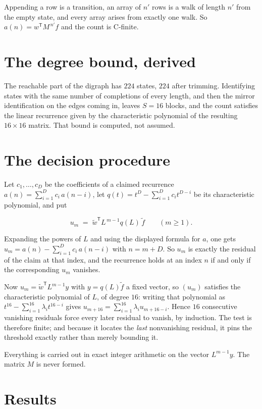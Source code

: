 \documentclass[11pt]{article}
\theoremstyle{definition}
\begin{document}
Appending a row is a transition, an array of $n'$ rows is a walk of length $n'$ from the empty state, and every array arises from exactly one walk. So $a(n) = w^{\mathsf T}M^{\,n'}f$ and the count is C-finite.

\section{The degree bound, derived}

The reachable part of the digraph has $224$ states, $224$ after trimming. Identifying states with the same number of completions of every length, and then the mirror identification on the edges coming in, leaves $S = 16$ blocks, and the count satisfies the linear recurrence given by the characteristic polynomial of the resulting $16\times16$ matrix. That bound is computed, not assumed.

\section{The decision procedure}

Let $c_1,\dots,c_D$ be the coefficients of a claimed recurrence $a(n) = \sum_{i=1}^{D} c_i\,a(n-i)$, let $q(t) = t^{D} - \sum_{i=1}^{D} c_i t^{D-i}$ be its characteristic polynomial, and put

\[u_m \;=\; \tilde w^{\mathsf T} L^{\,m-1} q(L)\,\tilde f \qquad (m \ge 1).\]

Expanding the powers of $L$ and using the displayed formula for $a$, one gets $u_m = a(n) - \sum_{i=1}^{D} c_i\,a(n-i)$ with $n = m + D$. So $u_m$ is exactly the residual of the claim at that index, and the recurrence holds at an index $n$ if and only if the corresponding $u_m$ vanishes.

Now $u_m = \tilde w^{\mathsf T} L^{m-1} y$ with $y = q(L)\tilde f$ a fixed vector, so $(u_m)$ satisfies the characteristic polynomial of $L$, of degree $16$: writing that polynomial as $t^{16} - \sum_{i=1}^{16} \lambda_i t^{16-i}$ gives $u_{m+16} = \sum_{i=1}^{16} \lambda_i u_{m+16-i}$. Hence $16$ consecutive vanishing residuals force every later residual to vanish, by induction. The test is therefore finite; and because it locates the {\itshape last} nonvanishing residual, it pins the threshold exactly rather than merely bounding it.

Everything is carried out in exact integer arithmetic on the vector $L^{m-1}y$. The matrix $M$ is never formed.

\section{Results}
\end{document}
